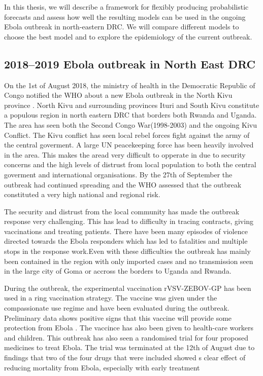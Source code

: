 \documentclass[12pt]{article}
\begin{document}
In this thesis, we will describe a framework for flexibly producing probabilistic forecasts and assess how well the resulting models can be used in the ongoing Ebola outbreak in north-eastern DRC. We will compare different models to choose the best model and to explore the epidemiology of the current outbreak. 

\subsection{2018--2019 Ebola outbreak in North East DRC}
On the 1st of August 2018, the ministry of health in the Democratic Republic of Congo notified the WHO about a new Ebola outbreak in the North Kivu province \cite{worldhealthorganizationEbolaOutbreakDRC2018a}. North Kivu and surrounding provinces Ituri and South Kivu constitute a populous region in north eastern DRC that borders both Rwanda and Uganda. The area has seen both the Second Congo War(1998-2003) and the ongoing Kivu Conflict. The Kivu conflict has seen local rebel forces fight against the army of the central goverment. A large UN peacekeeping force has been heavily involved in the area. This makes the aread very difficult to opperate in due to security concerns and the high levels of distrust from local population to both the central goverment and international organisations. By the 27th of September the outbreak had continued spreading and the WHO assessed that the outbreak constituted a very high national and regional risk\cite{worldhealthorganizationEbolaOutbreakDRC2018b}.

The security and distrust from the local community has made the outbreak response very challenging. This has lead to difficulty in tracing contracts, giving vaccinations and treating patients. There have been many episodes of violence directed towards the Ebola responders which has led to fatalities and multiple stops in the response work\cite{worldhealthorganizationEbolaOutbreakDRC2018c,worldhealthorganizationEbolaOutbreakDRC2019a}.Even with these difficulties the outbreak has mainly been contained in the region with only imported cases and no transmission seen in the large city of Goma or accross the borders to Uganda and Rwanda. 

During the outbreak, the experimental vaccination rVSV-ZEBOV-GP has been used in a ring vaccination strategy. The vaccine was given under the compassionate use regime and have been evaluated during the outbreak. Preliminary data shows positive signs that this vaccine will provide some protection from Ebola \cite{organizationPreliminaryResultsEfficacy2019}. The vaccince has also been given to health-care workers and children. This outbreak has also seen a randomised trial for four proposed medicines to treat Ebola. The trial was terminated at the 12th of August due to findings that two of the four drugs that were included showed s clear effect of reducing mortality from Ebola, especially with early treatment \cite{nationalinstituteofallergyandinfectiousdiseasesIndependentMonitoringBoard2019}
\end{document}
